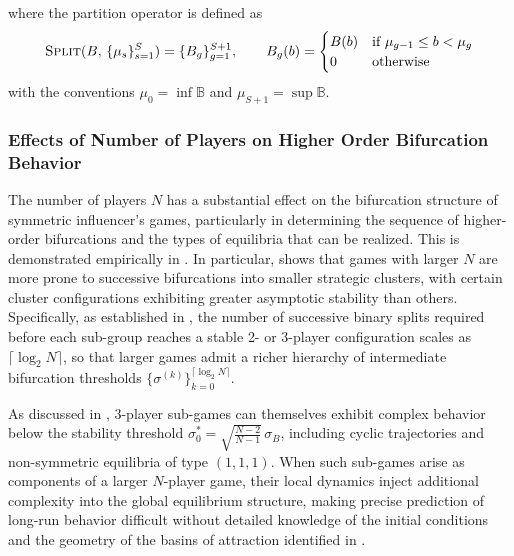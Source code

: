 \documentclass{article}
\begin{document}
            where the partition operator is defined as
            \begin{equation}
                \textsc{Split}(B,\, \{\mu_s\}_{s=1}^{S}) = 
                \{B_g\}_{g=1}^{S+1}, \qquad
                B_g(b) = \begin{cases} B(b) & \text{if } \mu_{g-1} \leq b < \mu_g \\ 
                0 & \text{otherwise} \end{cases}
            \end{equation}
            with the conventions $\mu_0 = \inf \mathbb{B}$ and $\mu_{S+1} = \sup \mathbb{B}$.
                
            \subsubsection{Effects of Number of Players on Higher Order Bifurcation Behavior}
                The number of players $N$ has a substantial effect on the bifurcation structure of symmetric influencer's games, particularly in determining the sequence of higher-order bifurcations and the types of equilibria that can be realized. This is demonstrated empirically in . In particular,  shows that games with larger $N$ are more prone to successive bifurcations into smaller strategic clusters, with certain cluster configurations exhibiting greater asymptotic stability than others. Specifically, as established in , the number of successive binary splits required before each sub-group reaches a stable 2- or 3-player configuration scales as $\lceil \log_2 N \rceil$, so that larger games admit a richer hierarchy of intermediate bifurcation thresholds $\{\sigma^{(k)}\}_{k=0}^{\lceil \log_2 N \rceil}$.

                As discussed in , 3-player sub-games can themselves exhibit complex behavior below the stability threshold $\sigma_0^* = \sqrt{\frac{N-2}{N-1}}\,\sigma_B$, including cyclic trajectories and non-symmetric equilibria of type $(1,1,1)$. When such sub-games arise as components of a larger $N$-player game, their local dynamics inject additional complexity into the global equilibrium structure, making precise prediction of long-run behavior difficult without detailed knowledge of the initial conditions and the geometry of the basins of attraction identified in .
\end{document}
